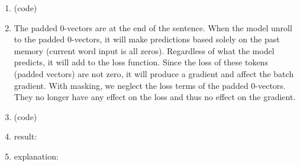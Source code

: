 \documentclass[10pt]{article}
\begin{document}
\begin{enumerate}[label=(\alph*)]
\item
(code)

\item
The padded 0-vectors are at the end of the sentence.
When the model unroll to the padded 0-vectors, it will make predictions based solely on the past memory (current word input is all zeros).
Regardless of what the model predicts, it will add to the loss function.
Since the loss of these tokens (padded vectors) are not zero, it will produce a gradient and affect the batch gradient.
With masking, we neglect the loss terms of the padded 0-vectors. They no longer have any effect on the loss and thus no effect on the gradient.\\

\item
(code)

\item
result:

\item
explanation:

\end{enumerate}
\clearpage
\end{document}
